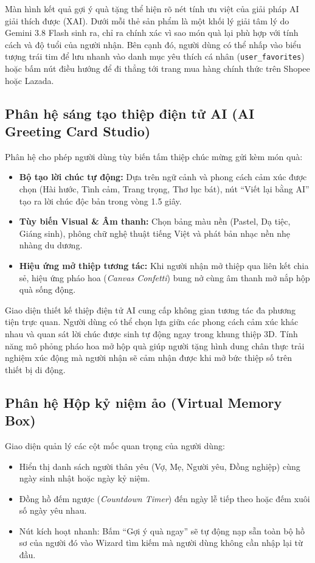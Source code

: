 Màn hình kết quả gợi ý quà tặng thể hiện rõ nét tính ưu việt của giải pháp AI giải thích được (XAI). Dưới mỗi thẻ sản phẩm là một khối lý giải tâm lý do Gemini 3.8 Flash sinh ra, chỉ ra chính xác vì sao món quà lại phù hợp với tính cách và độ tuổi của người nhận. Bên cạnh đó, người dùng có thể nhấp vào biểu tượng trái tim để lưu nhanh vào danh mục yêu thích cá nhân (\texttt{user\_favorites}) hoặc bấm nút điều hướng để đi thẳng tới trang mua hàng chính thức trên Shopee hoặc Lazada.

\subsection{Phân hệ sáng tạo thiệp điện tử AI (AI Greeting Card Studio)}
Phân hệ cho phép người dùng tùy biến tấm thiệp chúc mừng gửi kèm món quà:
\begin{itemize}
    \item \textbf{Bộ tạo lời chúc tự động:} Dựa trên ngữ cảnh và phong cách cảm xúc được chọn (Hài hước, Tình cảm, Trang trọng, Thơ lục bát), nút ``Viết lại bằng AI'' tạo ra lời chúc độc bản trong vòng 1.5 giây.
    \item \textbf{Tùy biến Visual \& Âm thanh:} Chọn bảng màu nền (Pastel, Dạ tiệc, Giáng sinh), phông chữ nghệ thuật tiếng Việt và phát bản nhạc nền nhẹ nhàng du dương.
    \item \textbf{Hiệu ứng mở thiệp tương tác:} Khi người nhận mở thiệp qua liên kết chia sẻ, hiệu ứng pháo hoa (\textit{Canvas Confetti}) bung nở cùng âm thanh mở nắp hộp quà sống động.
\end{itemize}

Giao diện thiết kế thiệp điện tử AI cung cấp không gian tương tác đa phương tiện trực quan. Người dùng có thể chọn lựa giữa các phong cách cảm xúc khác nhau và quan sát lời chúc được sinh tự động ngay trong khung thiệp 3D. Tính năng mô phỏng pháo hoa mở hộp quà giúp người tặng hình dung chân thực trải nghiệm xúc động mà người nhận sẽ cảm nhận được khi mở bức thiệp số trên thiết bị di động.

\subsection{Phân hệ Hộp kỷ niệm ảo (Virtual Memory Box)}
Giao diện quản lý các cột mốc quan trọng của người dùng:
\begin{itemize}
    \item Hiển thị danh sách người thân yêu (Vợ, Mẹ, Người yêu, Đồng nghiệp) cùng ngày sinh nhật hoặc ngày kỷ niệm.
    \item Đồng hồ đếm ngược (\textit{Countdown Timer}) đến ngày lễ tiếp theo hoặc đếm xuôi số ngày yêu nhau.
    \item Nút kích hoạt nhanh: Bấm ``Gợi ý quà ngay'' sẽ tự động nạp sẵn toàn bộ hồ sơ của người đó vào Wizard tìm kiếm mà người dùng không cần nhập lại từ đầu.
\end{itemize}

